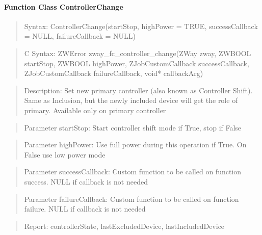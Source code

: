 \paragraph{Function Class ControllerChange}
\begin{quote}Syntax: ControllerChange(startStop, highPower = TRUE, successCallback = NULL, failureCallback = NULL)\end{quote}
\begin{quote}C Syntax: ZWError zway\_fc\_controller\_change(ZWay zway, ZWBOOL startStop, ZWBOOL highPower, ZJobCustomCallback successCallback, ZJobCustomCallback failureCallback, void* callbackArg)\end{quote}
\begin{quote}Description: Set new primary controller (also known as Controller Shift). Same as Inclusion, but the newly included device will get the role of primary. Available only on primary controller\end{quote}
\begin{quote}Parameter startStop: Start controller shift mode if True, stop if False\end{quote}
\begin{quote}Parameter highPower: Use full power during this operation if True. On False use low power mode\end{quote}
\begin{quote}Parameter successCallback: Custom function to be called on function success. NULL if callback is not needed\end{quote}
\begin{quote}Parameter failureCallback: Custom function to be called on function failure. NULL if callback is not needed\end{quote}
\begin{quote}Report: controllerState, lastExcludedDevice, lastIncludedDevice\end{quote}

